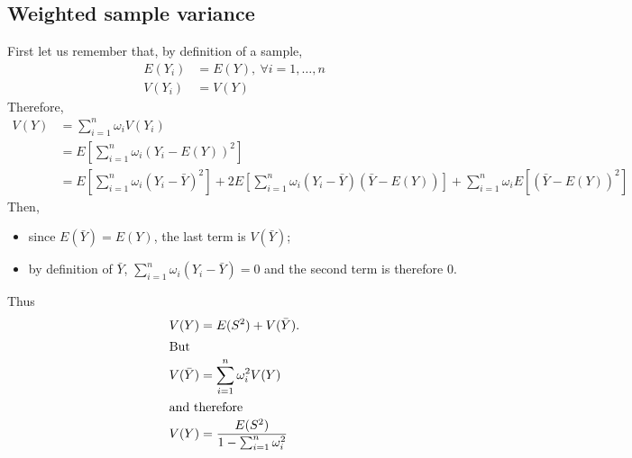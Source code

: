 \documentclass[11pt]{article}
\begin{document}
\begin{appendices}
\section{Weighted sample variance}
\label{appendixb}
First let us remember that, by definition of a sample,
\begin{align}
E(Y_i) &= E(Y),\ \forall i=1,\ldots, n\\
V(Y_i) &= V(Y)
\end{align}
Therefore,
\begin{align*}
V(Y) &= \sum_{i=1}^n \omega_i V(Y_i)\\
      &= E\left[ \sum_{i=1}^n \omega_i(Y_i - E(Y))^2 \right]\\
      &= E\left[ \sum_{i=1}^n \omega_i(Y_i - \bar{Y})^2 \right] 
      + 2 E\left[ \sum_{i=1}^n \omega_i(Y_i - \bar{Y})(\bar{Y} - E(Y)) \right]
      +  \sum_{i=1}^n \omega_i E\left[ (\bar{Y} - E(Y))^2 \right]
\end{align*}
Then,
\begin{itemize}
\item since $E(\bar{Y}) = E(Y)$, the last term is $V(\bar{Y})$;
\item by definition of $\bar{Y}$, $\sum_{i=1}^n \omega_i(Y_i - \bar{Y})=0$ and the second term is therefore 0.
\end{itemize}
Thus
\begin{align}
V(Y) &= E(S^2) + V(\bar{Y}).\\
\intertext{But} 
V(\bar{Y}) &= \sum_{i=1}^n \omega_i^2 V(Y)\\
\intertext{and therefore}
V(Y) &= \frac{E(S^2)}{1-\sum_{i=1}^n \omega_i^2}
\end{align}
\end{appendices}


\end{document}
